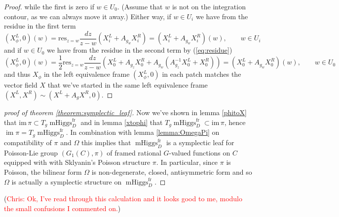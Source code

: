 \documentclass[11pt, oneside, reqno]{amsart}
\theoremstyle{definition} \newtheorem{definition}{Definition}[section]
\theoremstyle{definition} \newtheorem{remark}[definition]{Remark}
\theoremstyle{definition} \newtheorem{remarks}[definition]{Remarks}
\theoremstyle{definition} \newtheorem{question}[definition]{Question}
\theoremstyle{definition} \newtheorem*{note}{Note}
\theoremstyle{definition} \newtheorem{example}[definition]{Example}
\theoremstyle{definition} \newtheorem{examples}[definition]{Examples}
\DeclareMathOperator{\mhiggs}{mHiggs}
\DeclareMathOperator{\im}{im}
\newcommand{\fr}{\mathrm{fr}}
\newcommand{\chris}[1]{(\textcolor{red}{Chris: #1})}
\begin{document}
\begin{proof}
 while the first is zero if $w \in U_0$. (Assume that $w$ is not on the integration
  contour, as we can always move it away.)
Either way, if $w \in U_i$ we have from the residue in the first term
  \begin{equation}
    (X^{L}_\phi, 0)(w) = \mathrm{res}_{z = w} \frac{dz}{ z - w} (X_{i}^{L} + A_{g_w} X_{i}^{R}) =
    (X_{i}^{L} + A_{g_w} X_{i}^{R})(w), \qquad w \in U_i
  \end{equation}
  and if $ w \in U_0$ we have from the residue in the second term by (\ref{eq:residue})
  \begin{equation}
    (X^{L}_\phi, 0)(w) = \frac 1 2 \mathrm{res}_{z = w} \frac{dz}{ z - w} (X_0^{L} + A_{g_z} X_0^{R} +  A_{g_{w}} ( A_{g_{z}}^{-1} X_0^{L} + X_0^{R} )) =
   ( X_{0}^{L} + A_{g_w} X_{0}^{R})(w), \qquad w \in U_0 
  \end{equation}
  and thus $X_\phi$ in the left equivalence
  frame $(X^{L}_{\phi}, 0)$ in each patch matches the vector field $X$ that we've started
  in the same left equivalence frame $(X^{L}, X^{R}) \sim (X^{L} + A_{g} X^{R}, 0 )$.
\end{proof}

\begin{proof}[proof of theorem \ref{theorem:symplectic_leaf}]
Now we've shown in lemma \ref{phitoX} that $\mathrm{im}\, \pi \subset T_{g} \mhiggs^{\fr}_{D}$
and in lemma \ref{xtophi} that $ T_{g} \mhiggs^{\fr}_{D} \subset \mathrm{im}\, \pi$,
hence $\im \pi =  T_{g} \mhiggs^{\fr}_{D}$. In combination with lemma \ref{lemma:OmegaPi}
on compatibility of $\pi$ and $\Omega$ this implies that $\mhiggs^{\fr}_{D}$ is
a symplectic leaf for Poisson-Lie group $(G_1(C), \pi)$ of framed rational $G$-valued functions
on $C$ equipped with  with Sklyanin's Poisson structure $\pi$. In particular,
since $\pi$ is Poisson, the bilinear form $\Omega$ is non-degenerate, closed, antisymmetric form
and so $\Omega$ is actually a  symplectic structure on $\mhiggs^{\fr}_{D}$. 
\end{proof}

\chris{Ok, I've read through this calculation and it looks good to me, modulo the small confusions I commented on.}



\end{document}
